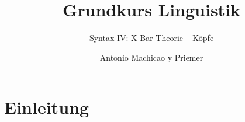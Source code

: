 
\title{Grundkurs Linguistik}

\subtitle{Syntax IV: X-Bar-Theorie -- Köpfe}

\author[aMyP]{
	{\small Antonio Machicao y Priemer}
}


\date{ }





\huberlintitlepage





\nocite{Brandt&Co06a}
\nocite{Glueck05a} 
\nocite{Grewendorf&Co91a} 
\nocite{Luedeling2009a} 
\nocite{MuellerS13f} 
\nocite{MuellerS15b}
\nocite{Repp&Co15a} 
\nocite{Stechow&Sternefeld88a}



\section{Einleitung}

